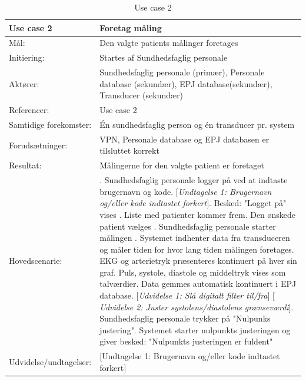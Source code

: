 \begin{table}[H]
\caption{Use case 2}\label{tab:tabel3}
\begin{tabular}{| l | >{\raggedright\arraybackslash}p{11cm} |}
   \hline
   \textbf{Use case 2} & \textbf{Foretag måling}\\ \hline
   Mål: & Den valgte patients målinger foretages\\ \hline
   Initiering: & Startes af Sundhedsfaglig personale\\ \hline
   Aktører:& Sundhedsfaglig personale (primær), Personale database (sekundær), EPJ database(sekundær), Transducer (sekundær)\\ \hline
   Referencer: & Use case 2 \\ \hline
   Samtidige forekomster: & Én sundhedsfaglig person og én transducer pr. system \\\hline
   Forudsætninger: & VPN, Personale database og EPJ databasen er tilsluttet korrekt\\ \hline
   Resultat:& Målingerne for den valgte patient er foretaget\\ \hline
   Hovedscenarie:& 
1. Sundhedsfaglig personale logger på ved at indtaste brugernavn og kode. \newline
   \textit{$[$Undtagelse 1: Brugernavn og/eller kode indtastet forkert$]$}\newline
2. Besked: "Logget på" vises  \newline
3. Liste med patienter kommer frem\newline
4. Den ønskede patient vælges \newline
5. Sundhedsfaglig personale starter målingen \newline
6. Systemet indhenter data fra transduceren og måler tiden for hvor lang tiden målingen foretages\newline
7. EKG og arterietryk præsenteres kontinuert på hver sin graf. Puls, systole, diastole og middeltryk vises som talværdier. Data gemmes automatisk kontinuert i EPJ database. \newline
\textit{$[$Udvidelse 1: Slå digitalt filter til/fra$]$}\newline
\textit{$[$Udvidelse 2: Juster systolens/diastolens grænseværdi$]$}\newline
8. Sundhedsfaglig personale trykker på "Nulpunks justering"\newline
9. Systemet starter nulpunkts justeringen og giver besked: "Nulpunkts justeringen er fuldent" \\\hline
Udvidelse/undtagelser: & $[$Undtagelse 1: Brugernavn og/eller kode indtastet forkert$]$\newline

\end{tabular}
\end{table}
